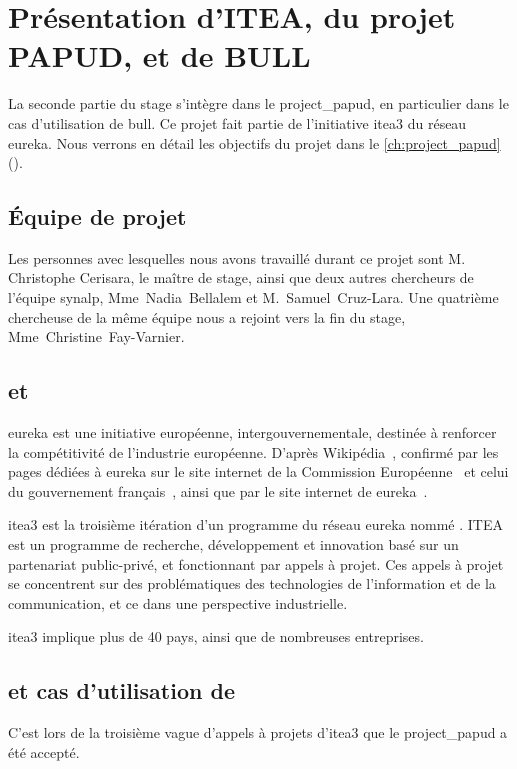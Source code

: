 \chapter{Présentation d'ITEA, du projet PAPUD, et de BULL}
La seconde partie du stage s'intègre dans le \gls{project_papud}, en particulier dans le cas d'utilisation de \gls{bull}. Ce projet fait partie de l'initiative \gls{itea3} du réseau \gls{eureka}.
%
Nous verrons en détail les objectifs du projet dans le \autoref{ch:project_papud} ().


\section{Équipe de projet}\label{sec:papud_colabo}
Les personnes avec lesquelles nous avons travaillé durant ce projet sont M. Christophe Cerisara, le maître de stage, ainsi que deux autres chercheurs de l'équipe \gls{synalp}, \mbox{Mme~Nadia~Bellalem} et \mbox{M.~Samuel~Cruz-Lara}.
Une quatrième chercheuse de la même équipe nous a rejoint vers la fin du stage, \mbox{Mme~Christine~Fay-Varnier}.

\section{ et }
\og\gls{eureka} est une initiative européenne, intergouvernementale, destinée à renforcer la compétitivité de l’industrie européenne.\fg{} D'après Wikipédia~\autocite{wiki_eureka}, confirmé par les pages dédiées à \gls{eureka} sur le site internet de la Commission Européenne~\autocite{ce_eureka} et celui du gouvernement français~\autocite{fr_eureka}, ainsi que par le site internet de \gls{eureka}~\autocite{eureka}.

\gls{itea3} est la troisième itération d'un programme du réseau \gls{eureka} nommé .
ITEA est un programme de recherche, développement et innovation basé sur un partenariat public-privé, et fonctionnant par appels à projet.
Ces appels à projet se concentrent sur des problématiques des technologies de l'information et de la communication, et ce dans une perspective industrielle.

\gls{itea3} implique plus de 40 pays, ainsi que de nombreuses entreprises.

\pagebreak
\section{ et cas d'utilisation de }
C'est lors de la troisième vague d'appels à projets d'\gls{itea3} que le  \gls{project_papud} a été accepté.

